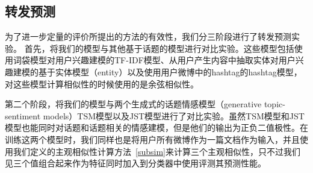 \subsection{转发预测}
为了进一步定量的评价所提出的方法的有效性，我们分三阶段进行了转发预测实验。
首先，将我们的模型与其他基于话题的模型进行对比实验。这些模型包括使用词袋模型对用户兴趣建模的TF-IDF模型、从用户产生内容中抽取实体对用户兴趣建模的基于实体模型（entity）以及使用用户微博中的hashtag的hashtag模型，对这些模型计算相似性的时候使用的是余弦相似性。

第二个阶段，将我们的模型与两个生成式的话题情感模型（generative topic-sentiment models）TSM模型以及JST模型进行了对比实验。虽然TSM模型和JST模型也能同时对话题和话题相关的情感建模，但是他们的输出为正负二值极性。在训练这两个模型时，我们同样也是将用户所有微博作为一篇文档作为输入，并且使用我们定义的主观相似性计算方法~\ref{subsim}来计算三个主观相似性，只不过我们见三个值组合起来作为特征同时加入到分类器中使用评测其预测性能。

